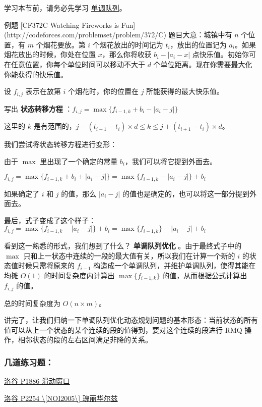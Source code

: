 学习本节前，请务必先学习 \href{/ds/monotonous-queue/}{单调队列}。

\begin{NOTE}{ 例题 [CF372C Watching Fireworks is Fun](http://codeforces.com/problemset/problem/372/C)}{}
题目大意：城镇中有 $n$ 个位置，有 $m$ 个烟花要放。第 $i$ 个烟花放出的时间记为 $t_i$，放出的位置记为 $a_i$。如果烟花放出的时候，你处在位置 $x$，那么你将收获 $b_i-|a_i-x|$ 点快乐值。初始你可在任意位置，你每个单位时间可以移动不大于 $d$ 个单位距离。现在你需要最大化你能获得的快乐值。
\end{NOTE}


设 $f_{i,j}$ 表示在放第 $i$ 个烟花时，你的位置在 $j$ 所能获得的最大快乐值。

写出 \textbf{ 状态转移方程 } ：$f_{i,j}=\max\{f_{i-1,k}+b_i-|a_i-j|\}$

这里的 $k$ 是有范围的，$j-(t_{i+1}-t_i)\times d\le k\le j+(t_{i+1}-t_i)\times d$。

我们尝试将状态转移方程进行变形：

由于 $\max$ 里出现了一个确定的常量 $b_i$，我们可以将它提到外面去。

$f_{i,j}=\max\{f_{i-1,k}+b_i+|a_i-j|\}=\max\{f_{i-1,k}-|a_i-j|\}+b_i$

如果确定了 $i$ 和 $j$ 的值，那么 $|a_i-j|$ 的值也是确定的，也可以将这一部分提到外面去。

最后，式子变成了这个样子：$f_{i,j}=\max\{f_{i-1,k}-|a_i-j|\}+b_i=\max\{f_{i-1,k}\}-|a_i-j|+b_i$

看到这一熟悉的形式，我们想到了什么？\textbf{ 单调队列优化 }。由于最终式子中的 $\max$ 只和上一状态中连续的一段的最大值有关，所以我们在计算一个新的 $i$ 的状态值时候只需将原来的 $f_{i-1}$ 构造成一个单调队列，并维护单调队列，使得其能在均摊 $O(1)$ 的时间复杂度内计算出 $\max\{f_{i-1,k}\}$ 的值，从而根据公式计算出 $f_{i,j}$ 的值。

总的时间复杂度为 $O(n\times m)$。

讲完了，让我们归纳一下单调队列优化动态规划问题的基本形态：当前状态的所有值可以从上一个状态的某个连续的段的值得到，要对这个连续的段进行 RMQ 操作，相邻状态的段的左右区间满足非降的关系。

\subsubsection{几道练习题：}

\href{https://www.luogu.org/problemnew/show/P1886}{洛谷 P1886 滑动窗口}

\href{https://www.luogu.org/problemnew/show/P2254}{洛谷 P2254 \textbackslash{}[NOI2005\textbackslash{}] 瑰丽华尔兹}


